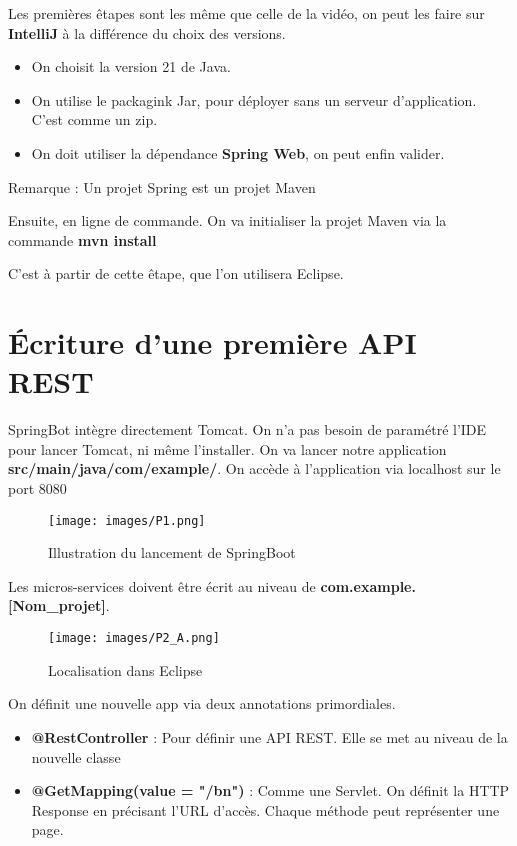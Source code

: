 \documentclass{rapport}
\begin{document}
Les premières êtapes sont les même que celle de la vidéo, on peut les faire sur \textbf{IntelliJ} à la différence du choix des versions.

\begin{itemize}
	\item On choisit la version 21 de Java.
	\item On utilise le packagink Jar, pour déployer sans un serveur d'application. C'est comme un zip. 
	\item On doit utiliser la dépendance \textbf{Spring Web}, on peut enfin valider.
\end{itemize}
Remarque :  Un projet Spring est un projet Maven\newline

Ensuite, en ligne de commande. On va initialiser la projet Maven via la commande \textbf{mvn install} 

C'est à partir de cette êtape, que l'on utilisera Eclipse. 


\section{Écriture d'une première API REST}

SpringBot intègre directement Tomcat. On n'a pas besoin de paramétré l'IDE pour lancer Tomcat, ni même l'installer. On va lancer notre application \textbf{src/main/java/com/example/}. On accède à l'application via localhost sur le port 8080

\begin{figure}[H]
	\centering
    \texttt{[image: images/P1.png]}
    \caption{Illustration du lancement de SpringBoot}
\end{figure}

Les micros-services doivent être écrit au niveau de \textbf{com.example.[Nom_projet]}. 

\begin{figure}[H]
	\centering
    \texttt{[image: images/P2\_A.png]}
    \caption{Localisation dans Eclipse}
\end{figure}

On définit une nouvelle app via deux annotations primordiales.
\begin{itemize}
	\item \textbf{@RestController} : Pour définir une API REST. Elle se met au niveau de la nouvelle classe
	\item \textbf{@GetMapping(value = "/bn")} : Comme une Servlet. On définit la HTTP Response en précisant l'URL d'accès. Chaque méthode peut représenter une page.
\end{itemize}
\end{document}
